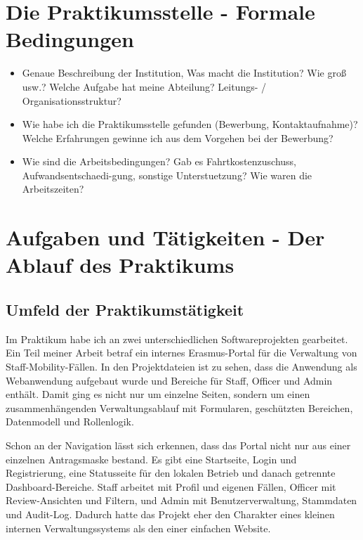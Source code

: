 \documentclass{Vorlage}
\begin{document}
\section{Die Praktikumsstelle - Formale Bedingungen}

\begin{itemize}

\item Genaue Beschreibung der Institution, Was macht die Institution? Wie gro\ss{} usw.? Welche Aufgabe hat meine Abteilung? Leitungs- / Organisationsstruktur?

\item Wie habe ich die Praktikumsstelle gefunden (Bewerbung, Kontaktaufnahme)? Welche Erfahrungen gewinne ich aus dem Vorgehen bei der Bewerbung?

\item Wie sind die Arbeitsbedingungen? Gab es Fahrtkostenzuschuss, Aufwandsentschaedi-gung, sonstige Unterstuetzung? Wie waren die Arbeitszeiten?

\end{itemize}

\newpage

\section{Aufgaben und T\"atigkeiten - Der Ablauf des Praktikums}

\renewcommand{\thesection}{\arabic{section}}

\subsection{Umfeld der Praktikumst\"atigkeit}

Im Praktikum habe ich an zwei unterschiedlichen Softwareprojekten gearbeitet. Ein Teil meiner Arbeit betraf ein internes Erasmus-Portal f\"ur die Verwaltung von Staff-Mobility-F\"allen. In den Projektdateien ist zu sehen, dass die Anwendung als Webanwendung aufgebaut wurde und Bereiche f\"ur Staff, Officer und Admin enth\"alt. Damit ging es nicht nur um einzelne Seiten, sondern um einen zusammenh\"angenden Verwaltungsablauf mit Formularen, gesch\"utzten Bereichen, Datenmodell und Rollenlogik.

Schon an der Navigation l\"asst sich erkennen, dass das Portal nicht nur aus einer einzelnen Antragsmaske bestand. Es gibt eine Startseite, Login und Registrierung, eine Statusseite f\"ur den lokalen Betrieb und danach getrennte Dashboard-Bereiche. Staff arbeitet mit Profil und eigenen F\"allen, Officer mit Review-Ansichten und Filtern, und Admin mit Benutzerverwaltung, Stammdaten und Audit-Log. Dadurch hatte das Projekt eher den Charakter eines kleinen internen Verwaltungssystems als den einer einfachen Website.
\end{document}
